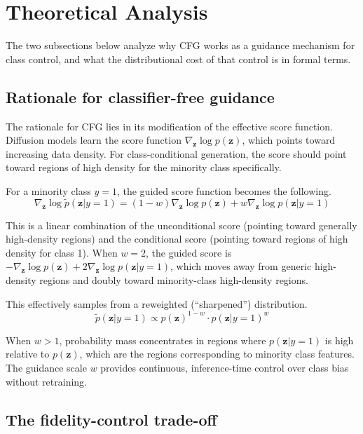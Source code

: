 \section{Theoretical Analysis}

The two subsections below analyze why CFG works as a guidance mechanism for class control, and what the distributional cost of that control is in formal terms.

\subsection{Rationale for classifier-free guidance}

The rationale for CFG lies in its modification of the effective score function. Diffusion models learn the score function $\nabla_\mathbf{z} \log p(\mathbf{z})$, which points toward increasing data density. For class-conditional generation, the score should point toward regions of high density for the minority class specifically.

For a minority class $y = 1$, the guided score function becomes the following.
\begin{equation}
\nabla_{\mathbf{z}} \log \tilde{p}(\mathbf{z} | y=1) = (1-w) \nabla_{\mathbf{z}} \log p(\mathbf{z}) + w \nabla_{\mathbf{z}} \log p(\mathbf{z}|y=1)
\end{equation}

This is a linear combination of the unconditional score (pointing toward generally high-density regions) and the conditional score (pointing toward regions of high density for class 1). When $w = 2$, the guided score is $-\nabla_{\mathbf{z}} \log p(\mathbf{z}) + 2\nabla_{\mathbf{z}} \log p(\mathbf{z}|y=1)$, which moves away from generic high-density regions and doubly toward minority-class high-density regions.

This effectively samples from a reweighted (``sharpened'') distribution.
\begin{equation}
\tilde{p}(\mathbf{z} | y=1) \propto p(\mathbf{z})^{1-w} \cdot p(\mathbf{z}|y=1)^w
\end{equation}

When $w > 1$, probability mass concentrates in regions where $p(\mathbf{z}|y=1)$ is high relative to $p(\mathbf{z})$, which are the regions corresponding to minority class features. The guidance scale $w$ provides continuous, inference-time control over class bias without retraining.


\subsection{The fidelity-control trade-off}

